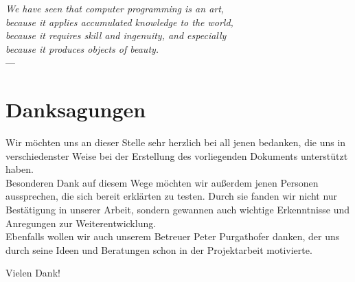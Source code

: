 
\begin{flushright}{\slshape    
    We have seen that computer programming is an art, \\ 
    because it applies accumulated knowledge to the world, \\ 
    because it requires skill and ingenuity, and especially \\
    because it produces objects of beauty.} \\ \medskip
    ---  \citep{knuth:1974}
\end{flushright}

\bigskip

\begingroup
\let\clearpage\relax
\let\cleardoublepage\relax
\let\cleardoublepage\relax
\chapter*{Danksagungen}
Wir möchten uns an dieser Stelle sehr herzlich bei all jenen bedanken, die uns in verschiedenster Weise bei der Erstellung des vorliegenden Dokuments unterstützt haben. \\
Besonderen Dank auf diesem Wege möchten wir außerdem jenen Personen aussprechen, die sich bereit erklärten \scribbler zu testen. Durch sie fanden wir nicht nur Bestätigung in unserer Arbeit, sondern gewannen auch wichtige Erkenntnisse und Anregungen zur Weiterentwicklung.\\
Ebenfalls wollen wir auch unserem Betreuer Peter Purgathofer danken, der uns durch seine Ideen und Beratungen schon in der Projektarbeit motivierte.

\medskip \noindent Vielen Dank!


\endgroup



